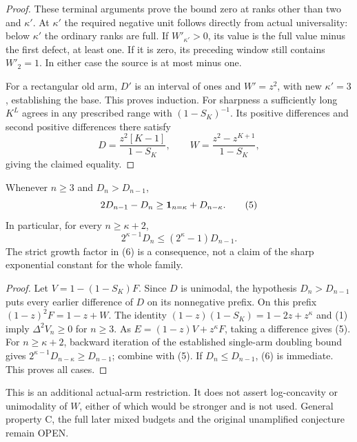 \begin{proof}
These terminal arguments prove the bound zero at ranks other
than two and $\kappa'$. At $\kappa'$ the required negative
unit follows directly from actual universality: below $\kappa'$
the ordinary ranks are full. If $W'_{\kappa'}>0$, its value is
the full value minus the first defect, at least one. If it is
zero, its preceding window still contains $W'_2=1$.
In either case the source is at most minus one.

For a rectangular old arm, $D'$ is an interval of ones and
$W'=z^2$, with new $\kappa'=3$, establishing the base.
This proves induction. For sharpness a sufficiently long $K^L$
agrees in any prescribed range with $(1-S_K)^{-1}$. Its positive
differences and second positive differences there satisfy
\[
 D=\frac{z^2[K-1]}{1-S_K},\qquad
 W=\frac{z^2-z^{K+1}}{1-S_K},
\]
giving the claimed equality.
\end{proof}

\begin{corollary}
Whenever $n\ge3$ and $D_n>D_{n-1}$,
\[
          2D_{n-1}-D_n\ge {\bf1}_{n=\kappa}+D_{n-\kappa}.
                                                               \tag{5}
\]
In particular, for every $n\ge\kappa+2$,
\[
       2^{\kappa-1}D_n
          \le(2^\kappa-1)D_{n-1}.                      \tag{6}
\]
The strict growth factor in (6) is a consequence, not a claim
of the sharp exponential constant for the whole family.
\end{corollary}

\begin{proof}
Let $V=1-(1-S_K)F$. Since $D$ is unimodal, the hypothesis
$D_n>D_{n-1}$ puts every earlier difference of $D$ on its
nonnegative prefix. On this prefix
$(1-z)^2F=1-z+W$.
The identity $(1-z)(1-S_K)=1-2z+z^\kappa$ and (1) imply
$\Delta^2V_n\ge0$ for $n\ge3$.
As $E=(1-z)V+z^\kappa F$, taking a difference gives (5).
For $n\ge\kappa+2$, backward iteration of the established
single-arm doubling bound gives
$2^{\kappa-1}D_{n-\kappa}\ge D_{n-1}$; combine with (5).
If $D_n\le D_{n-1}$, (6) is immediate. This proves all cases.
\end{proof}

This is an additional actual-arm restriction. It does not assert
log-concavity or unimodality of $W$, either of which would be
stronger and is not used. General property C, the full later mixed
budgets and the original unamplified conjecture remain OPEN.

